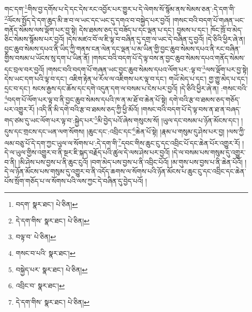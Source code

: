 གང་དག་\footnote{བདག་  སྣར་ཐང་།  པེ་ཅིན། }གིས་བྱ་དགོས་པ་དེ་དང་དེས་རང་འབྱོར་པར་གྱུར་པ་དེ་ལེགས་སོ་སྙོམ་ནས་སེམས་ཅན་:དེ་དག་གི་\footnote{དེ་དག་གིས་  སྣར་ཐང་།  པེ་ཅིན། }ལོངས་སྤྱོད་དེ་དག་ཆུད་མི་ཟ་བ་ལ་ཡང་དང་ཡང་དུ་དགའ་བ་བསྐྱེད་པར་བྱའོ། །གསང་བའི་བདག་པོ་གཞན་ཡང་གནོད་སེམས་ལས་ལྡོག་པར་བྱ་སྟེ། དེས་ཐམས་ཅད་དུ་བཟོད་པ་དང་ལྡན་པ་དང་། བྱམས་པ་དང་། ཁོང་ཁྲོ་བ་མེད་ཅིང་སེམས་སྙོམས་པར་བྱའོ། །དེས་མཛའ་བོ་ལ་ཇི་ལྟ་བ་བཞིན་དུ་དགྲ་ལ་ཡང་དེ་བཞིན་དུ་བྱའོ། །དེ་ཅིའི་ཕྱིར་ཞེ་ན། བྱང་ཆུབ་སེམས་དཔའ་ནི་ཡིད་ཀྱི་གནས་ངན་ལེན་དང་ལྡན་པ་མ་ཡིན་གྱི་བྱང་ཆུབ་སེམས་དཔའ་ནི་རང་བཞིན་གྱིས་བསམ་པ་ཡོངས་སུ་དག་པ་ཡིན་ནོ། །གསང་བའི་བདག་པོ་དེ་ལྟ་བས་ན་བྱང་ཆུབ་སེམས་དཔའ་གནོད་སེམས་དང་བྲལ་བར་བྱའོ། །གསང་བའི་བདག་པོ་གཞན་ཡང་བྱང་ཆུབ་སེམས་དཔའ་ལོག་པར་:ལྟ་བ་\footnote{བལྟ་བ་  པེ་ཅིན། }ལས་ལྡོག་པར་བྱ་སྟེ། དེས་ཡང་དག་པའི་ལྟ་བ་དང་། འཇིག་རྟེན་ཕ་རོལ་ལ་འཇིགས་པར་ལྟ་བ་དང་། གཡོ་མེད་པ་དང་། གྱ་གྱུ་མེད་པ་དང་། དྲང་བ་དང་། སངས་རྒྱས་དང་ཆོས་དང་དགེ་འདུན་དག་ལ་བསམ་པ་ངེས་པར་བྱའོ། །དེ་ཅིའི་ཕྱིར་ཞེ་ན། :གསང་བའི་\footnote{གསང་བ་པའི་  སྣར་ཐང་། }བདག་པོ་ལོག་པར་ལྟ་བ་ནི་བྱང་ཆུབ་སེམས་དཔའི་ཁ་ན་མ་ཐོ་བ་ཆེན་པོ་སྟེ། དགེ་བའི་རྩ་བ་ཐམས་ཅད་གཅོད་པར་འགྱུར་རོ། །འདི་ནི་མི་དགེ་བའི་རྩ་བ་ཐམས་ཅད་ཀྱི་ཕྱི་མོའོ། །གསང་བའི་བདག་པོ་དེ་ལྟ་བས་ན་ཐ་ན་བཞད་གད་ཙམ་དུ་ཡང་ལོག་པར་ལྟ་བ་:སྐྱེད་པར་\footnote{བསྐྱེད་པར་  སྣར་ཐང་།  པེ་ཅིན། }མི་བྱེད་པའོ་ཞེས་གསུངས་སོ། །ཡུལ་དང་བསམ་པ་ཉོན་མོངས་དང་། །དུས་དང་གྲངས་དང་ཡན་ལག་སོགས། །ཆུང་དང་:འབྲིང་དང་\footnote{འབྲིང་བ་  སྣར་ཐང་། }ཆེན་པོ་སྟེ། །རྣམ་པ་གསུམ་དུ་ཤེས་པར་བྱ། །ལས་ཀྱི་ལམ་བཅུ་པོ་དེ་དག་ཀྱང་ཡུལ་ལ་སོགས་པ་:དེ་དག་གི་\footnote{དེ་དག་གིས་  སྣར་ཐང་།  པེ་ཅིན། }དབང་གིས་ཆུང་ངུ་དང་འབྲིང་པོ་དང་ཆེན་པོར་འགྱུར་རོ། །དེ་ལ་ཡུལ་གྱིས་འགྱུར་བ་ནི་སྔར་ཇི་སྐད་བརྗོད་པའི་ཚུལ་དེ་ལས་ཤེས་པར་བྱའོ། །དེ་ལ་བསམ་པས་གསུམ་དུ་འགྱུར་བ་ནི། །མི་ཤེས་པས་བྱས་པ་ནི་ཆུང་ངུའོ། །བག་མེད་པས་བྱས་པ་ནི་འབྲིང་པོའོ། །མ་གུས་པས་བྱས་པ་ནི་ཆེན་པོའོ། །དེ་ལ་ཉོན་མོངས་པས་གསུམ་དུ་འགྱུར་བ་ནི་འདོད་ཆགས་ལ་སོགས་པའི་ཉོན་མོངས་པ་ཆུང་ངུ་དང་འབྲིང་དང་ཆེན་པོས་སྲོག་གཅོད་པ་ལ་སོགས་པའི་ལས་ཀྱང་དེ་བཞིན་དུ་བྱེད་པའོ། །
